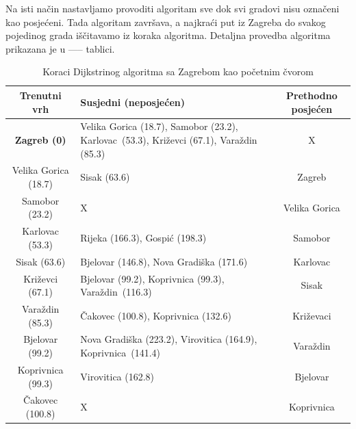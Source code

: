 \documentclass[10pt]{scrartcl}
\begin{document}
Na isti način nastavljamo provoditi algoritam sve dok svi gradovi nisu označeni kao posjećeni. Tada algoritam završava, a najkraći put iz Zagreba do svakog pojedinog grada iščitavamo iz koraka algoritma. Detaljna provedba algoritma prikazana je u ----- tablici.

\pagebreak[4]
\begin{center}
\begin{table}[H]
\caption{Koraci Dijkstrinog algoritma sa Zagrebom kao početnim čvorom}
\begin{tabularx}{1\textwidth}{c X c}
\hline
\textbf{Trenutni vrh} & \textbf{Susjedni (neposjećen)}                                                          & \textbf{Prethodno posjećen} \\ \hline
\textbf{Zagreb (0)}             & Velika Gorica (18.7), Samobor (23.2), Karlovac~(53.3), Križevci (67.1), Varaždin (85.3) & X                           \\ \hline
Velika Gorica (18.7)   & Sisak (63.6)                                                                            & Zagreb                      \\ \hline
Samobor (23.2)         & X                                                                                       & Velika Gorica               \\ \hline
Karlovac (53.3)        & Rijeka (166.3), Gospić (198.3)                                                          & Samobor                     \\ \hline
Sisak (63.6)           & {\color[HTML]{9B9B9B} Bjelovar (146.8)}, Nova Gradiška (171.6)                          & Karlovac                    \\ \hline
Križevci (67.1)        & Bjelovar (99.2), Koprivnica (99.3), {\color[HTML]{9B9B9B} Varaždin~(116.3)}             & Sisak                       \\ \hline
Varaždin (85.3)        & Čakovec (100.8), {\color[HTML]{9B9B9B} Koprivnica (132.6)}                              & Križevaci                   \\ \hline
Bjelovar (99.2)        & {\color[HTML]{9B9B9B} Nova Gradiška (223.2), Virovitica (164.9), Koprivnica~(141.4)}    & Varaždin                    \\ \hline
Koprivnica (99.3)      & Virovitica (162.8)                                                                      & Bjelovar                    \\ \hline
Čakovec (100.8)        & X                                                                                       & Koprivnica                  \\ \hline

\end{tabularx}
\end{table}
\end{center}
\end{document}
